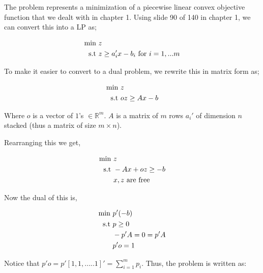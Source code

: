 


The problem represents a minimization of a piecewise linear convex objective function that we dealt with in chapter 1. Using slide 90 of 140 in chapter 1, we can convert this into a LP as;

\begin{align}
    \text{min } &z \notag\\
    \text{s.t }  &z \ge a_i'x - b_i \text{ for } i=1,...m\notag
\end{align}

To make it easier to convert to a dual problem, we rewrite this in matrix form as;

\begin{align}
    \text{min } &z \notag\\
    \text{s.t }  &oz \ge Ax - b \notag
\end{align}

Where $o$ is a vector of $1$'s $\in \mathbb{R}^m$. $A$ is a matrix of $m$ rows $a_i'$ of dimension $n$ stacked (thus a matrix of size $m \times n$).

Rearranging this we get,

\begin{align}
    \text{min } &z \notag\\
    \text{s.t }  &-Ax + oz \ge -b  \notag\\
                &x, z \text{ are free }\notag
\end{align}

Now the dual of this is, 

\begin{align}
    \text{min } &p'(-b) \notag\\
    \text{s.t }  &p \ge 0  \notag\\
                &-p'A = 0 = p'A \notag\\
                &p'o = 1 \notag
\end{align}

Notice that $p'o = p' [1, 1, .....1]' = \sum_{i=1}^{m} p_i$. Thus, the problem is written as:

